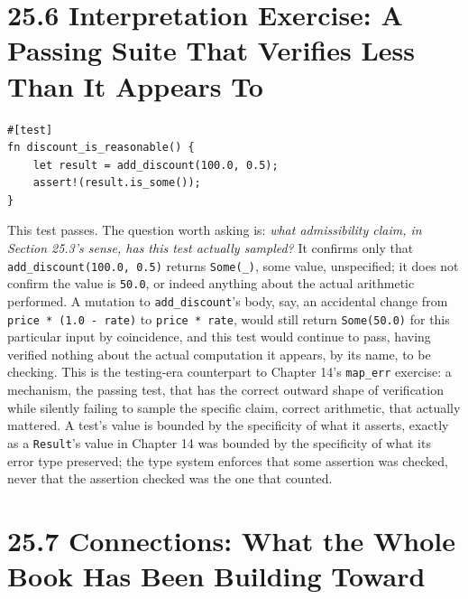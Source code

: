 \documentclass[11pt]{book}
\begin{document}
\section*{25.6 Interpretation Exercise: A Passing Suite That Verifies Less Than It Appears To}

\begin{lstlisting}
#[test]
fn discount_is_reasonable() {
    let result = add_discount(100.0, 0.5);
    assert!(result.is_some());
}
\end{lstlisting}

This test passes. The question worth asking is: \emph{what admissibility claim, in Section 25.3's sense, has this test actually sampled?} It confirms only that \texttt{add\_discount(100.0, 0.5)} returns \texttt{Some(\_)}, some value, unspecified; it does not confirm the value is \texttt{50.0}, or indeed anything about the actual arithmetic performed. A mutation to \texttt{add\_discount}'s body, say, an accidental change from \texttt{price * (1.0 - rate)} to \texttt{price * rate}, would still return \texttt{Some(50.0)} for this particular input by coincidence, and this test would continue to pass, having verified nothing about the actual computation it appears, by its name, to be checking. This is the testing-era counterpart to Chapter 14's \texttt{map\_err} exercise: a mechanism, the passing test, that has the correct outward shape of verification while silently failing to sample the specific claim, correct arithmetic, that actually mattered. A test's value is bounded by the specificity of what it asserts, exactly as a \texttt{Result}'s value in Chapter 14 was bounded by the specificity of what its error type preserved; the type system enforces that some assertion was checked, never that the assertion checked was the one that counted.

\section*{25.7 Connections: What the Whole Book Has Been Building Toward}
\end{document}

